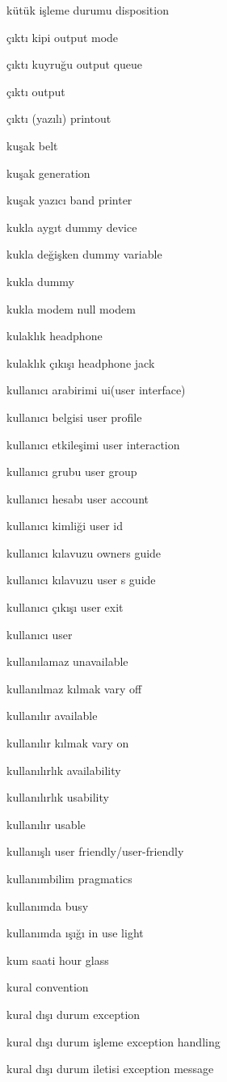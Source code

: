 \documentclass[12pt,fleqn]{article}\usepackage{../../common}
\begin{document}
kütük işleme durumu disposition

çıktı kipi output mode

çıktı kuyruğu output queue

çıktı output

çıktı (yazılı) printout

kuşak belt

kuşak generation

kuşak yazıcı band printer

kukla aygıt dummy device

kukla değişken dummy variable

kukla dummy

kukla modem null modem

kulaklık headphone

kulaklık çıkışı headphone jack

kullanıcı arabirimi ui(user interface)

kullanıcı belgisi user profile

kullanıcı etkileşimi user interaction

kullanıcı grubu user group

kullanıcı hesabı user account

kullanıcı kimliği user id

kullanıcı kılavuzu owners guide

kullanıcı kılavuzu user s guide

kullanıcı çıkışı user exit

kullanıcı user

kullanılamaz unavailable

kullanılmaz kılmak vary off

kullanılır available

kullanılır kılmak vary on

kullanılırlık availability

kullanılırlık usability

kullanılır usable

kullanışlı user friendly/user-friendly

kullanımbilim pragmatics

kullanımda busy

kullanımda ışığı in use light

kum saati hour glass

kural convention

kural dışı durum exception

kural dışı durum işleme exception handling

kural dışı durum iletisi exception message
\end{document}
